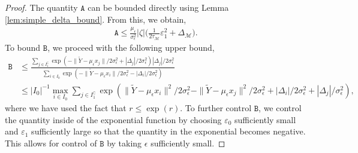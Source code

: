 \documentclass[10pt]{article}
\theoremstyle{plain}
\theoremstyle{definition}
\theoremstyle{remark}
\newcommand{\M}{{\mathcal{M}}}
\newcommand{\gap}{\Delta_\M}
\begin{document}
\begin{proof}
The quantity \(\mathtt{A}\) can be bounded directly using Lemma \ref{lem:simple_delta_bound}. From this, we obtain,
\begin{align*}
    \mathtt{A} \leq \frac{\mu_\epsilon}{\sigma^2_\epsilon} |\zeta| \Big ( \tfrac{1}{2 \tau_\M} \varepsilon_1^2 + \gap \Big ).
\end{align*}
To bound \(\mathtt{B}\), we proceed with the following upper bound,
\begin{align}
    \mathtt{B} &\leq \frac{\sum_{j \in I_1^\complement} \exp(-\|\tilde{Y} - \mu_\epsilon x_j\|/2\sigma_\epsilon^2 + |\Delta_j|/2\sigma_\epsilon^2) |\Delta_j|/2\sigma_\epsilon^2}{\sum_{i \in I_0}\exp(-\|\tilde{Y} - \mu_\epsilon x_i\|/2\sigma_\epsilon^2-|\Delta_i|/2\sigma_\epsilon^2)} \nonumber\\
    &\leq |I_0|^{-1} \max_{i \in I_0}\sum_{j \in I_1^\complement} \exp(\|\tilde{Y} - \mu_\epsilon x_i\|^2/2\sigma_\epsilon^2 - \|\tilde{Y} - \mu_\epsilon x_j\|^2/2\sigma_\epsilon^2 + |\Delta_i|/2\sigma_\epsilon^2 + |\Delta_j|/\sigma_\epsilon^2),\label{eq:drbg_3}
\end{align}
where we have used the fact that \(r \leq \exp(r)\). To further control \(\mathtt{B}\), we control the quantity inside of the exponential function by choosing \(\varepsilon_0\) sufficiently small and \(\varepsilon_1\) sufficiently large so that the quantity in the exponential becomes negative. This allows for control of \(\mathtt{B}\) by taking \(\epsilon\) sufficiently small.


\end{proof}
\end{document}
